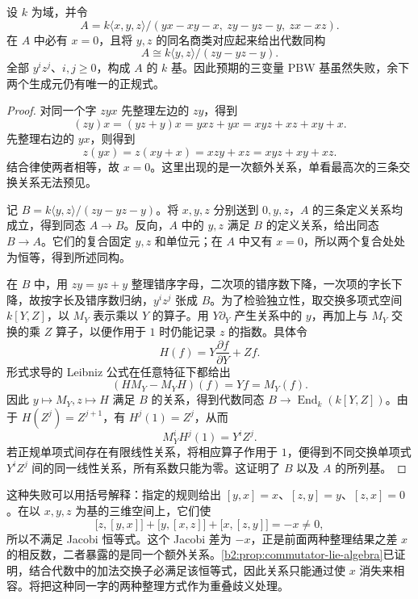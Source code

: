 \begin{proposition}\label{b2:exm:incompatible-pbw-relations}
	设 \(k\) 为域，并令
	\[
		A=k\langle x,y,z\rangle/(yx-xy-x,\ zy-yz-y,\ zx-xz).
	\]
	在 \(A\) 中必有 \(x=0\)，且将 \(y,z\) 的同名商类对应起来给出代数同构
	\[
		A\cong k\langle y,z\rangle/(zy-yz-y).
	\]
	全部 \(y^iz^j\)、\(i,j\ge0\)，构成 \(A\) 的 \(k\) 基。因此预期的三变量 PBW 基虽然失败，余下两个生成元仍有唯一的正规式。
\end{proposition}
\begin{proof}
	对同一个字 \(zyx\) 先整理左边的 \(zy\)，得到
	\[
		(zy)x=(yz+y)x=yxz+yx=xyz+xz+xy+x.
	\]
	先整理右边的 \(yx\)，则得到
	\[
		z(yx)=z(xy+x)=xzy+xz=xyz+xy+xz.
	\]
	结合律使两者相等，故 \(x=0\)。这里出现的是一次额外关系，单看最高次的三条交换关系无法预见。

	记 \(B=k\langle y,z\rangle/(zy-yz-y)\)。将 \(x,y,z\) 分别送到 \(0,y,z\)，\(A\) 的三条定义关系均成立，得到同态 \(A\to B\)。反向，\(A\) 中的 \(y,z\) 满足 \(B\) 的定义关系，给出同态 \(B\to A\)。它们的复合固定 \(y,z\) 和单位元；在 \(A\) 中又有 \(x=0\)，所以两个复合处处为恒等，得到所述同构。

	在 \(B\) 中，用 \(zy=yz+y\) 整理错序字母，二次项的错序数下降，一次项的字长下降，故按字长及错序数归纳，\(y^iz^j\) 张成 \(B\)。为了检验独立性，取交换多项式空间 \(k[Y,Z]\)，以 \(M_Y\) 表示乘以 \(Y\) 的算子。用 \(Y\partial_Y\) 产生关系中的 \(y\)，再加上与 \(M_Y\) 交换的乘 \(Z\) 算子，以便作用于 \(1\) 时仍能记录 \(z\) 的指数。具体令
	\[
		H(f)=Y\frac{\partial f}{\partial Y}+Zf.
	\]
	形式求导的 Leibniz 公式在任意特征下都给出
	\[
		(HM_Y-M_YH)(f)=Yf=M_Y(f).
	\]
	因此 \(y\mapsto M_Y,z\mapsto H\) 满足 \(B\) 的关系，得到代数同态 \(B\to\operatorname{End}_k(k[Y,Z])\)。由于 \(H(Z^j)=Z^{j+1}\)，有 \(H^j(1)=Z^j\)，从而
	\[
		M_Y^iH^j(1)=Y^iZ^j.
	\]
	若正规单项式间存在有限线性关系，将相应算子作用于 \(1\)，便得到不同交换单项式 \(Y^iZ^j\) 间的同一线性关系，所有系数只能为零。这证明了 \(B\) 以及 \(A\) 的所列基。
\end{proof}

这种失败可以用括号解释：指定的规则给出 \([y,x]=x\)、\([z,y]=y\)、\([z,x]=0\)。在以 \(x,y,z\) 为基的三维空间上，它们使
\[
	\bigl[z,[y,x]\bigr]+\bigl[y,[x,z]\bigr]+\bigl[x,[z,y]\bigr]=-x\ne0,
\]
所以不满足 Jacobi 恒等式。这个 Jacobi 差为 \(-x\)，正是前面两种整理结果之差 \(x\) 的相反数，二者暴露的是同一个额外关系。\cref{b2:prop:commutator-lie-algebra}已证明，结合代数中的加法交换子必满足该恒等式，因此关系只能通过使 \(x\) 消失来相容。将把这种同一字的两种整理方式作为重叠歧义处理。
